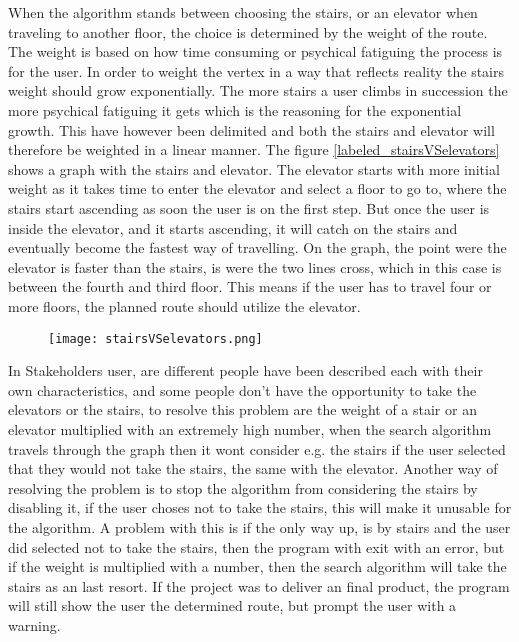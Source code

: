 When the algorithm stands between choosing the stairs, or an elevator when traveling to another floor, the choice is determined by the weight of the route. The weight is based on how time consuming or psychical fatiguing the process is for the user. In order to weight the vertex in a way that reflects reality the stairs weight should grow exponentially. The more stairs a user climbs in succession the more psychical fatiguing it gets which is the reasoning for the exponential growth. This have however been delimited 
 and both the stairs and elevator will therefore be weighted in a linear manner. The figure \cref{labeled_stairsVSelevators} shows a graph with the stairs and elevator. The elevator starts with more initial weight as it takes time to enter the elevator and select a floor to go to, where the stairs start ascending as soon the user is on the first step. But once the user is inside the elevator, and it starts ascending, it will catch on the stairs and eventually become the fastest way of travelling. On the graph, the point were the elevator is faster than the stairs, is were the two lines cross, which in this case is between the fourth and third floor. This means if the user has to travel four or more floors, the planned route should utilize the elevator.

\begin{figure}[ht!]
    \centering
    \texttt{[image: stairsVSelevators.png]}
    \label{fig:labeled_stairsVSelevators}
  \end{figure}


In Stakeholders user, are different people have been described each with their own characteristics, and some people don't have the opportunity to take the elevators or the stairs, to resolve this problem are the weight of a stair or an elevator multiplied with an extremely high number, when the search algorithm travels through the graph then it wont consider e.g. the stairs if the user selected that they would not take the stairs, the same with the elevator. Another way of resolving the problem is to stop the algorithm from considering the stairs by disabling it, if the user choses not to take the stairs, this will make it unusable for the algorithm. A problem with this is if the only way up, is by stairs and the user did selected not to take the stairs, then the program with exit with an error, but if the weight is multiplied with a number, then the search algorithm will take the stairs as an last resort. If the project was to deliver an final product, the program will still show the user the determined route, but prompt the user with a warning.



